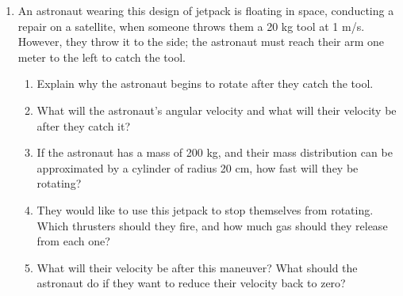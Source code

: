 \documentclass[12pt]{article}
\begin{document}
\begin{enumerate}
			\item An astronaut wearing this design of jetpack is floating in space, conducting a repair on a satellite, when someone throws them a 20 kg tool at 1 m/s. However, they throw it to the side; the astronaut must reach 
				their arm one meter to the left to catch the tool. 

				\begin{enumerate}
					\item Explain why the astronaut begins to rotate after they catch the tool.
					\item What will the astronaut's angular velocity and what will their velocity be after they catch it?
					\item If the astronaut has a mass of 200 kg, and their mass distribution can be approximated by a cylinder of radius 20 cm, how fast will they be rotating?
					\item They would like to use this jetpack to stop themselves from rotating. Which thrusters should they fire, and how much gas should they release from each one?
					\item What will their velocity be after this maneuver? What should the astronaut do if they want to reduce their velocity back to zero?
				\end{enumerate}




\end{enumerate}
\end{document}
